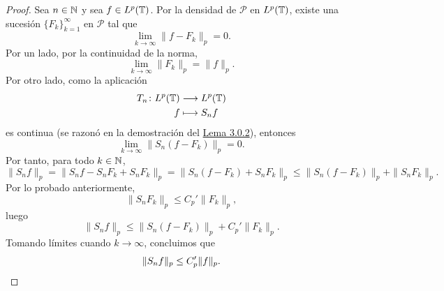 \documentclass[a4paper, 12pt]{book}
\begin{document}
\begin{proof}
    Sea $n \in \mathbb N$ y sea $f \in L^p(\mathbb T)$. Por la densidad de $\mathcal{P}$ en $L^p(\mathbb T)$, existe una sucesión $\{F_k\}_{k=1}^\infty$ en $\mathcal{P}$ tal que
    \[\lim_{k\to\infty}\|f-F_k\|_p = 0.\]
    Por un lado, por la continuidad de la norma,
    \[\lim_{k\to\infty}\|F_k\|_p = \|f\|_p.\]
    Por otro lado, como la aplicación
    \begin{align*}
        T_n \colon L^p(\mathbb T) &\longrightarrow L^p(\mathbb T) \\
        f &\longmapsto S_nf
    \end{align*}
    es continua (se razonó en la demostración del \hyperref[3.0.2]{Lema 3.0.2}), entonces 
    \[\lim_{k\to\infty}\|S_n(f-F_k)\|_p = 0.\]
    Por tanto, para todo $k \in \mathbb N$,
    \[\|S_nf\|_p = \|S_nf-S_nF_k+S_nF_k\|_p = \|S_n(f-F_k)+S_nF_k\|_p  \leq \|S_n(f-F_k)\|_p + \|S_nF_k\|_p.\]
    Por lo probado anteriormente,
    \[\|S_nF_k\|_p \leq C_p'\|F_k\|_p,\]
    luego
    \[\|S_nf\|_p  \leq \|S_n(f-F_k)\|_p + C_p'\|F_k\|_p.\]
    Tomando límites cuando $k \to\infty$, concluimos que
    \[\|S_nf\|_p \leq C_p'\|f\|_p. \qedhere\]
\end{proof}


\end{document}
